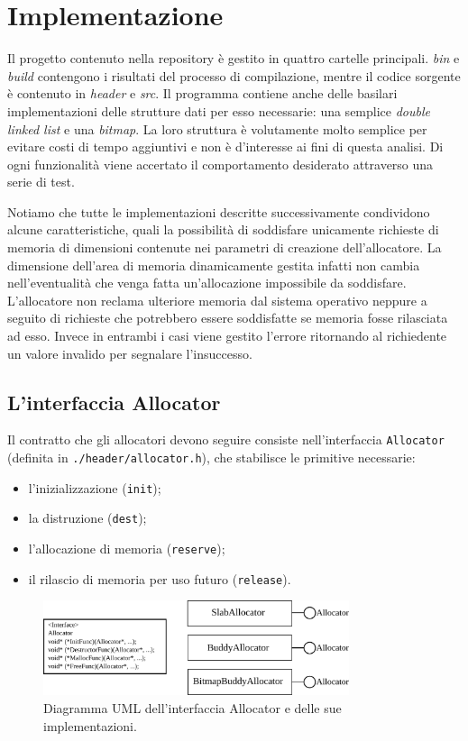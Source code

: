 \chapter{Implementazione}
Il progetto contenuto nella repository è gestito in quattro cartelle principali. \textit{bin} e \textit{build} contengono i risultati del processo di compilazione, mentre il codice sorgente è contenuto in \textit{header} e \textit{src}. Il programma contiene anche delle basilari implementazioni delle strutture dati per esso necessarie: una semplice \textit{double linked list} e una \textit{bitmap}. La loro struttura è volutamente molto semplice per evitare costi di tempo aggiuntivi e non è d’interesse ai fini di questa analisi. Di ogni funzionalità viene accertato il comportamento desiderato attraverso una serie di test.

Notiamo che tutte le implementazioni descritte successivamente condividono alcune caratteristiche, quali la possibilità di soddisfare unicamente richieste di memoria di dimensioni contenute nei parametri di creazione dell'allocatore. La dimensione dell’area di memoria dinamicamente gestita infatti non cambia nell’eventualità che venga fatta un’allocazione impossibile da soddisfare. L’allocatore non reclama ulteriore memoria dal sistema operativo neppure a seguito di richieste che potrebbero essere soddisfatte se memoria fosse rilasciata ad esso. Invece in entrambi i casi viene gestito l’errore ritornando al richiedente un valore invalido per segnalare l’insuccesso.

\section{L’interfaccia Allocator}
Il contratto che gli allocatori devono seguire consiste nell’interfaccia \texttt{Allocator} (definita in \texttt{./header/allocator.h}), che stabilisce le primitive necessarie:
\begin{itemize}
    \item l’inizializzazione (\texttt{init});
    \item la distruzione (\texttt{dest});
    \item l’allocazione di memoria (\texttt{reserve});
    \item il rilascio di memoria per uso futuro (\texttt{release}).
\end{itemize}


\begin{figure}[H]
    \centering
    \includegraphics[width=0.8\textwidth]{images/allocator_interface_uml.pdf}
    \caption{Diagramma UML dell'interfaccia Allocator e delle sue implementazioni.}
    \label{fig:uml_allocator_interface}
\end{figure}

